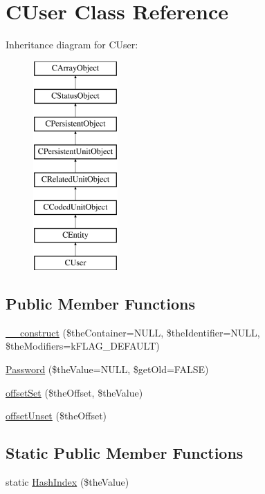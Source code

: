 \hypertarget{class_c_user}{\section{C\-User Class Reference}
\label{class_c_user}
}
Inheritance diagram for C\-User\-:\begin{figure}[H]
\begin{center}
\leavevmode
\includegraphics[height=8.000000cm]{class_c_user}
\end{center}
\end{figure}
\subsection*{Public Member Functions}
\begin{DoxyCompactItemize}
\item 
\hyperlink{class_c_user_af83ffccb40893a43d90eafe396cbdec1}{\-\_\-\-\_\-construct} (\$the\-Container=N\-U\-L\-L, \$the\-Identifier=N\-U\-L\-L, \$the\-Modifiers=k\-F\-L\-A\-G\-\_\-\-D\-E\-F\-A\-U\-L\-T)
\item 
\hyperlink{class_c_user_a0e6f1cf51ad23f971ed0999f8d248c8d}{Password} (\$the\-Value=N\-U\-L\-L, \$get\-Old=F\-A\-L\-S\-E)
\item 
\hyperlink{class_c_user_aace3446b9cacfe28cc1937c608fcc999}{offset\-Set} (\$the\-Offset, \$the\-Value)
\item 
\hyperlink{class_c_user_aed8557e18a89d868cedf5a48328b33b2}{offset\-Unset} (\$the\-Offset)
\end{DoxyCompactItemize}
\subsection*{Static Public Member Functions}
\begin{DoxyCompactItemize}
\item 
static \hyperlink{class_c_user_ada20d1f74260a4a5f67453bc9b4f3990}{Hash\-Index} (\$the\-Value)
\end{DoxyCompactItemize}
